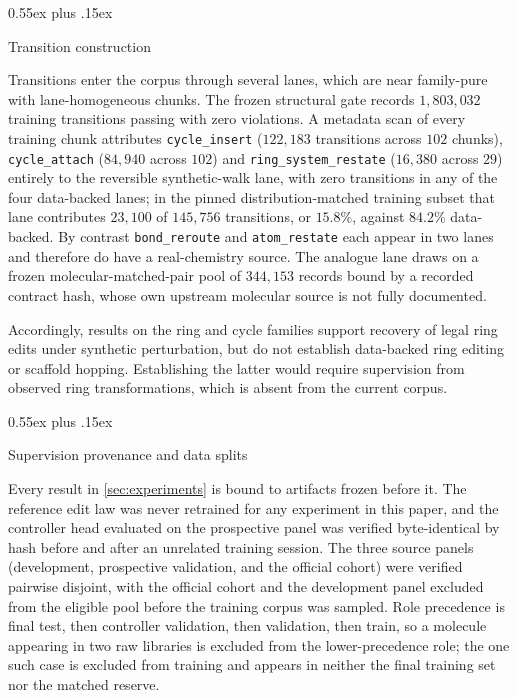 \documentclass{article}
\makeatletter
\theoremstyle{definition}
\theoremstyle{remark}
\def\subsection{\@startsection{subsection}{2}{\z@}{-1.2ex plus -0.4ex minus -.2ex}%
  {0.55ex plus .15ex}{\normalsize\sc\raggedright}}
\newcommand{\op}[1]{\texttt{#1}}
\makeatother
\begin{document}
\subsection{Transition construction}

Transitions enter the corpus through several lanes, which are near family-pure with lane-homogeneous chunks. The frozen structural gate records $1{,}803{,}032$ training transitions passing with zero violations. A metadata scan of every training chunk attributes \texttt{cycle\_insert} ($122{,}183$ transitions across $102$ chunks), \texttt{cycle\_attach} ($84{,}940$ across $102$) and \texttt{ring\_system\_restate} ($16{,}380$ across $29$) entirely to the reversible synthetic-walk lane, with zero transitions in any of the four data-backed lanes; in the pinned distribution-matched training subset that lane contributes $23{,}100$ of $145{,}756$ transitions, or $15.8\%$, against $84.2\%$ data-backed. By contrast \op{bond\_reroute} and \op{atom\_restate} each appear in two lanes and therefore do have a real-chemistry source. The analogue lane draws on a frozen molecular-matched-pair pool of $344{,}153$ records bound by a recorded contract hash, whose own upstream molecular source is not fully documented.

Accordingly, results on the ring and cycle families support recovery of legal ring edits under synthetic perturbation, but do not establish data-backed ring editing or scaffold hopping. Establishing the latter would require supervision from observed ring transformations, which is absent from the current corpus.

\subsection{Supervision provenance and data splits}

Every result in \cref{sec:experiments} is bound to artifacts frozen before it. The reference edit law was never retrained for any experiment in this paper, and the controller head evaluated on the prospective panel was verified byte-identical by hash before and after an unrelated training session. The three source panels (development, prospective validation, and the official cohort) were verified pairwise disjoint, with the official cohort and the development panel excluded from the eligible pool before the training corpus was sampled. Role precedence is final test, then controller validation, then validation, then train, so a molecule appearing in two raw libraries is excluded from the lower-precedence role; the one such case is excluded from training and appears in neither the final training set nor the matched reserve.
\end{document}
